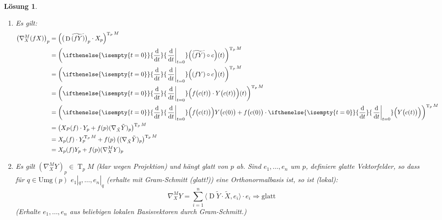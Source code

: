 \documentclass[paper=A4, twoside, chapterprefix=true, bibliography=totoc, headsepline]{scrbook}
\DeclareMathOperator{\D}{D}         %
\DeclareMathOperator{\T}{T}         %
\newcommand{\dop}{\mathrm{d}}
\newcommand{\difffrac}[3][]{\ifthenelse{\isempty{#1}}{\frac{\dop #2}{\dop #3}}{\left. \frac{\dop #2}{\dop #3} \right|_{#1}}}
\theoremstyle{plain}
\theoremstyle{nonumberplain}
\theoremstyle{empty}
\theoremstyle{break}
\newtheorem{Loes}{L\"osung}
\begin{document}
\begin{Loes}
\begin{enumerate}[label=(\arabic*.\arabic*)]
\begin{align*}
		&= \left( (\D \tilde Y)_p (f(p)X_p) \right)^{\T_pM}\\
		&= f(p) \left( (\D \tilde Y)_p X_p \right)^{\T_pM}\\
		&= f(p) \left( \nabla_X^M Y)_p \right)
	\end{align*}
\item[(2.2)]
	Es gilt:
	\begin{align*}
		\left( \nabla_X^M(fX) \right)_p &= \left( \big(\D\widetilde{(fY)}\big)_p \cdot X_p \right)^{\T_pM}\\
		&= \left( \difffrac[t=0]{}{t} \Big( \widetilde{(fY)} \circ c \Big) (t) \right)^{\T_pM}\\
		&= \left( \difffrac[t=0]{}{t} \Big( (fY) \circ c \Big) (t) \right)^{\T_pM}\\
		&= \left( \difffrac[t=0]{}{t} \Big( f\big(c(t)\big) \cdot Y\big(c(t)\big) \Big) (t) \right)^{\T_pM}\\
		&= \left( \difffrac[t=0]{}{t} \Big( f\big(c(t)\big) \Big) Y\big(c(0)\big) + f\big(c(0)\big) \cdot \difffrac[t=0]{}{t} \Big( Y\big(c(t)\big) \Big) \right)^{\T_pM}\\
		&= \left( X_P(f) \cdot Y_p + f(p)(\nabla_{\tilde X} \tilde Y)_p \right)^{\T_pM}\\
		&= X_p(f) \cdot Y_p^{\T_pM} + f(p)\left((\nabla_{\tilde X} \tilde Y)_p \right)^{\T_pM}\\
		&= X_p(f) Y_p + f(p)(\nabla_X^MY)_p
	\end{align*}
\item[(3)]
	Es gilt $(\nabla_X^MY)_p \in \T_pM$ (klar wegen Projektion) und h\"angt glatt von $p$ ab. Sind $e_1, \ldots ,e_n$ um $p$, definiere glatte Vektorfelder, so dass f\"ur $q \in \mathrm{Umg}(p)$ $e_1|_q, \ldots ,e_n|_q$ (erhalte mit Gram-Schmitt (glatt!)) eine Orthonormalbasis ist, so ist (lokal):
		\[ \nabla_X^M Y = \sum_{i=1}^n \langle \D \tilde Y \cdot \tilde X, e_i \rangle \cdot e_i \Rightarrow \text{glatt} \]
	(Erhalte $e_1,\ldots ,e_n$ aus beliebigen lokalen Basisvektoren durch Gram-Schmitt.)
\end{enumerate}
\end{Loes}
\end{document}
